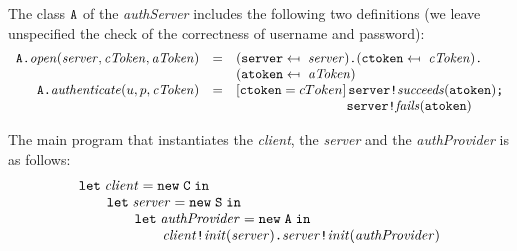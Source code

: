 \documentclass{LMCS}
\theoremstyle{plain}\newtheorem{proposition}[thm]{Proposition}
\theoremstyle{plain}\newtheorem{lemma}[thm]{Lemma}
\theoremstyle{plain}\newtheorem{theorem}[thm]{Theorem}
\theoremstyle{plain}\newtheorem{corollary}[thm]{Corollary}
\newcommand{\invk}{\mbox{\tt !}}
\newcommand{\prefix}{\mbox{\tt .}}
\newcommand{\newact}[1]{{\tt new} \; #1}
\newcommand{\letin}[3]{{\tt let} \; #1 = #2 \; {\tt in} \; #3}
\newcommand{\ite}{\mbox{{\tt ;}}}
\newcommand{\upd}{\mapsfrom~}
\newcommand{\adef}[1]{{\tt #1}}
\begin{document}
\begin{exa}
The class ${\adef{A}}$ of the {\it authServer}
includes the following two definitions (we leave unspecified
the check of the correctness of username and password):
$$
\begin{array}{rll}
\adef{A} \prefix 
{\it open}({\it server},{\it cToken},{\it aToken}) & = &
(\server \upd {\it server}) \prefix (\ctoken \upd {\it cToken}) \prefix \\
& & (\atoken \upd {\it aToken})
\\
\adef{A} \prefix 
{\it authenticate}(u,p,{\it cToken}) & = & 
[\ctoken = cToken] \, 
\sfield \invk {\it succeeds}(\atoken) \ite \\
& &  \qquad \qquad \qquad \qquad  \ \sfield \invk {\it fails}(\atoken)
\end{array} 
$$


The main program that instantiates the {\it client},
the {\it server} and the {\it authProvider} is as follows:
$$
\begin{array}{l}
\letin{{\it client}}{\newact{\adef{C}}}{ }
\\
\qquad 
\letin{{\it server}}{\newact{\adef{S}}}{ }
\\
\qquad \qquad 
\letin{{\it authProvider}}{\newact{\adef{A}}}{}
\\
\qquad \qquad \qquad {\it client} \invk {\it init}({\it server}) \prefix 
{\it server} \invk {\it init}({\it authProvider})
\end{array}
$$
\end{exa}
\end{document}
